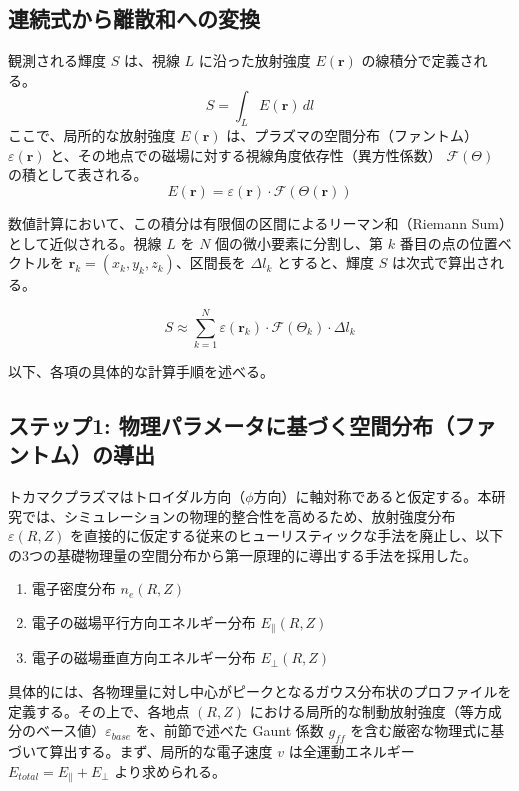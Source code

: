 \documentclass[a4paper,11pt]{bxjsarticle} %
\begin{document}
\subsection{連続式から離散和への変換}

観測される輝度 $S$ は、視線 $L$ に沿った放射強度 $E(\bm{r})$ の線積分で定義される。
\begin{equation}
    S = \int_{L} E(\bm{r}) \, dl
\end{equation}
ここで、局所的な放射強度 $E(\bm{r})$ は、プラズマの空間分布（ファントム） $\varepsilon(\bm{r})$ と、その地点での磁場に対する視線角度依存性（異方性係数） $\mathcal{F}(\Theta)$ の積として表される。
\begin{equation}
    E(\bm{r}) = \varepsilon(\bm{r}) \cdot \mathcal{F}(\Theta(\bm{r}))
\end{equation}

数値計算において、この積分は有限個の区間によるリーマン和（Riemann Sum）として近似される。視線 $L$ を $N$ 個の微小要素に分割し、第 $k$ 番目の点の位置ベクトルを $\bm{r}_k = (x_k, y_k, z_k)$、区間長を $\Delta l_k$ とすると、輝度 $S$ は次式で算出される。

\begin{equation}
    S \approx \sum_{k=1}^{N} \varepsilon(\bm{r}_k) \cdot \mathcal{F}(\Theta_k) \cdot \Delta l_k
\end{equation}

以下、各項の具体的な計算手順を述べる。

\subsection{ステップ1: 物理パラメータに基づく空間分布（ファントム）の導出}
トカマクプラズマはトロイダル方向（$\phi$方向）に軸対称であると仮定する。本研究では、シミュレーションの物理的整合性を高めるため、放射強度分布 $\varepsilon(R, Z)$ を直接的に仮定する従来のヒューリスティックな手法を廃止し、以下の3つの基礎物理量の空間分布から第一原理的に導出する手法を採用した。

\begin{enumerate}
    \item 電子密度分布 $n_e(R, Z)$
    \item 電子の磁場平行方向エネルギー分布 $E_{\parallel}(R, Z)$
    \item 電子の磁場垂直方向エネルギー分布 $E_{\perp}(R, Z)$
\end{enumerate}

具体的には、各物理量に対し中心がピークとなるガウス分布状のプロファイルを定義する。その上で、各地点 $(R, Z)$ における局所的な制動放射強度（等方成分のベース値）$\varepsilon_{base}$ を、前節で述べた Gaunt 係数 $g_{ff}$ を含む厳密な物理式に基づいて算出する。まず、局所的な電子速度 $v$ は全運動エネルギー $E_{total} = E_{\parallel} + E_{\perp}$ より求められる。
\end{document}
